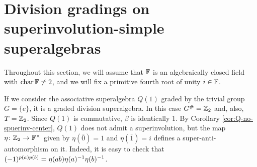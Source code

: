 




\section{Division gradings on superinvolution-simple\texorpdfstring{\\}{} superalgebras}\label{sec:div-grads-on-sinv-simple}

Throughout this section, we will assume that $\mathbb{F}$ is an algebraically closed field with $\operatorname{char} \mathbb{F} \neq 2$, and we will fix a primitive fourth root of unity $i \in \mathbb{F}$.

\begin{ex}
	If we consider the associative superalgebra $Q(1)$ graded by the trivial group $G = \{e\}$, it is a graded division superalgebra.
	In this case $G^\# = \mathbb{Z}_2$ and, also, $T = \mathbb{Z}_2$.
	Since $Q(1)$ is commutative, $\beta$ is identically $1$.
	By Corollary \ref{cor:Q-no-spuerinv-center}, $Q(1)$ does not admit a superinvolution, but the map $\eta\colon \mathbb{Z}_2 \to \mathbb{F}^\times$ given by $\eta (\bar 0) = 1$ and $\eta( \bar 1) = i$ defines a super-anti-automorphism on it.
	Indeed, it is easy to check that $(-1)^{p(a) p(b)} =  \eta(ab) \eta(a)^{-1} \eta(b)^{-1}$.
\end{ex}

